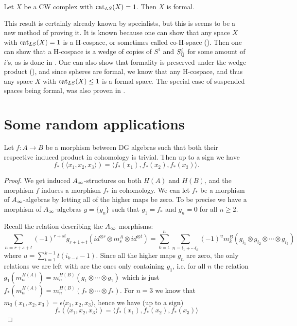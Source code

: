 \begin{corollary}
Let $X$ be a CW complex with $\text{cat}_{LS}(X)=1$. Then $X$ is formal. 
\end{corollary}

This result is certainly already known by specialists, but this is seems to be a new method of proving it. It is known because one can show that any space $X$ with $\text{cat}_{LS}(X)=1$ is a H-cospace, or sometimes called co-H-space (\cite{hess}). Then one can show that a H-cospace is a wedge of copies of $S^1$ and $S_{\mathbb{Q}}^i$ for some amount of $i$'s, as is done in \cite[Theorem 3.]{co-H-space}. One can also show that formality is preserved under the wedge product (\cite{hess}), and since spheres are formal, we know that any H-cospace, and thus any space $X$ with $\text{cat}_{LS}(X)\leq 1$ is a formal space. The special case of suspended spaces being formal, was also proven in \cite[Proposition 13.9.]{FHT}. 



\iffalse

\section{Some random applications}

\begin{proposition}
Let $f\colon A\longrightarrow B$ be a morphism between DG algebras such that both their respective induced product in cohomology is trivial. Then up to a sign we have
\begin{equation*}
    f_*(\langle x_1, x_2, x_3\rangle) = \langle f_*(x_1), f_*(x_2),  f_*(x_3)\rangle.
\end{equation*}
\end{proposition}
\begin{proof}
We get induced $A_{\infty}$-structures on both $H(A)$ and $H(B)$, and the morphism $f$ induces a morphism $f_*$ in cohomology. We can let $f_*$ be a morphism of $A_{\infty}$-algebras by letting all of the higher maps be zero. To be precise we have a morphism of $A_{\infty}$-algebras $g = \{g_n\}$ such that $g_1 = f_*$ and $g_n=0$ for all $n\geq 2$. 

Recall the relation describing the $A_{\infty}$-morphisms:
\begin{equation*}
    \sum_{n = r+s+t}(-1)^{r+st}g_{r+1+t}(id^{\otimes r}\otimes m_s^A \otimes id^{\otimes t}) = \sum_{k=1}^{n}\sum_{n=i_1+\cdots i_k}(-1)^{u} m_k^B(g_{i_1}\otimes g_{i_2}\otimes \cdots \otimes g_{i_k})
\end{equation*}
where $u=\displaystyle \sum_{t=1}^{k-1}t(i_{k-t}-1)$. Since all the higher maps $g_n$ are zero, the only relations we are left with are the ones only containing $g_1$, i.e. for all $n$ the relation $g_1(m_n^{H(A)}) = m_n^{H(B)}(g_1\otimes \cdots \otimes g_1)$ which is just $f_*(m_n^{H(A)}) = m_n^{H(B)}(f_*\otimes \cdots \otimes f_*)$. For $n=3$ we know that $m_3(x_1, x_2, x_3) = \epsilon \langle x_1, x_2, x_3\rangle$, hence we have (up to a sign)
\begin{equation*}
    f_*(\langle x_1, x_2, x_3\rangle) = \langle f_*(x_1), f_*(x_2),  f_*(x_3)\rangle
\end{equation*}
\end{proof}


